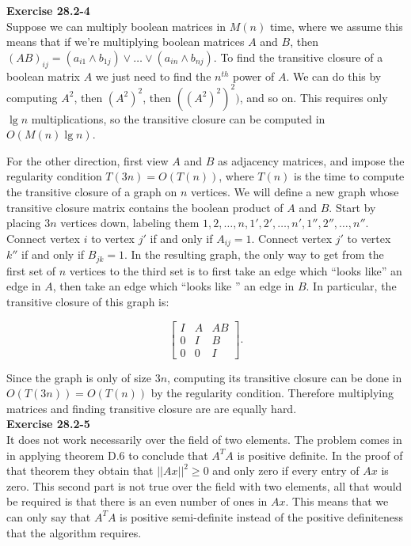 \documentclass{article}
\begin{document}
\noindent\textbf{Exercise 28.2-4}\\

Suppose we can multiply boolean matrices in $M(n)$ time, where we assume this means that if we're multiplying boolean matrices $A$ and $B$, then $(AB)_{ij} = (a_{i1}\wedge b_{1j}) \vee \ldots \vee (a_{in} \wedge b_{nj})$.  To find the transitive closure of a boolean matrix $A$ we just need to find the $n^{th}$ power of $A$.  We can do this by computing $A^2$, then $(A^2)^2$, then $((A^2)^2)^2)$, and so on.  This requires only $\lg n$ multiplications, so the transitive closure can be computed in $O(M(n)\lg n)$.  

For the other direction, first view $A$ and $B$ as adjacency matrices, and impose the regularity condition $T(3n) = O(T(n))$, where $T(n)$ is the time to compute the transitive closure of a graph on $n$ vertices.  We will define a new graph whose transitive closure matrix contains the boolean product of $A$ and $B$.  Start by placing $3n$ vertices down, labeling them $1,2,\ldots, n, 1', 2', \ldots, n', 1'', 2'', \ldots, n''$.  Connect vertex $i$ to vertex $j'$ if and only if $A_{ij} = 1$.  Connect vertex $j'$ to vertex $k''$ if and only if $B_{jk} = 1$. In the resulting graph, the only way to get from the first set of $n$ vertices to the third set is to first take an edge which ``looks like'' an edge in $A$, then take an edge which ``looks like '' an edge in $B$. In particular, the transitive closure of this graph is:

\[ \left[ \begin{array}{ccc} I & A & AB \\ 0 & I & B \\ 0 & 0 & I \end{array} \right].\]

Since the graph is only of size $3n$, computing its transitive closure can be done in $O(T(3n)) = O(T(n))$ by the regularity condition.  Therefore multiplying matrices and finding transitive closure are are equally hard. \\

\noindent\textbf{Exercise 28.2-5}\\

It does not work necessarily over the field of two elements. The problem comes in in applying theorem D.6 to conclude that $A^TA$ is positive definite. In the proof of that theorem they obtain that $||Ax||^2 \ge 0$ and only zero if every entry of $Ax$ is zero. This second part is not true over the field with two elements, all that would be required is that there is an even number of ones in $Ax$. This means that we can only say that $A^TA$ is positive semi-definite instead of the positive definiteness that the algorithm requires.\\
\end{document}
